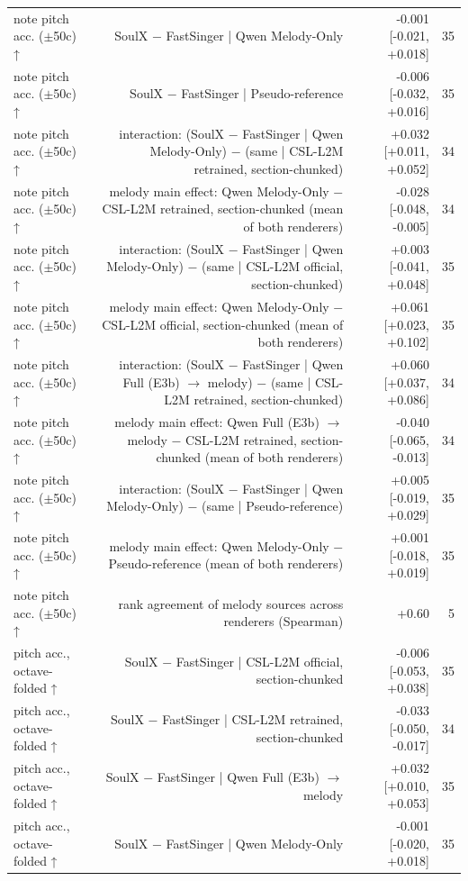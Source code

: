 \begin{table}[t]
\begin{tabular}{lrrr}
note pitch acc. ($\pm$50c) ↑ & SoulX $-$ FastSinger | Qwen Melody-Only & -0.001 [-0.021, +0.018] & 35 \\
note pitch acc. ($\pm$50c) ↑ & SoulX $-$ FastSinger | Pseudo-reference & -0.006 [-0.032, +0.016] & 35 \\
note pitch acc. ($\pm$50c) ↑ & interaction: (SoulX $-$ FastSinger | Qwen Melody-Only) $-$ (same | CSL-L2M retrained, section-chunked) & +0.032 [+0.011, +0.052] & 34 \\
note pitch acc. ($\pm$50c) ↑ & melody main effect: Qwen Melody-Only $-$ CSL-L2M retrained, section-chunked (mean of both renderers) & -0.028 [-0.048, -0.005] & 34 \\
note pitch acc. ($\pm$50c) ↑ & interaction: (SoulX $-$ FastSinger | Qwen Melody-Only) $-$ (same | CSL-L2M official, section-chunked) & +0.003 [-0.041, +0.048] & 35 \\
note pitch acc. ($\pm$50c) ↑ & melody main effect: Qwen Melody-Only $-$ CSL-L2M official, section-chunked (mean of both renderers) & +0.061 [+0.023, +0.102] & 35 \\
note pitch acc. ($\pm$50c) ↑ & interaction: (SoulX $-$ FastSinger | Qwen Full (E3b) $\rightarrow$ melody) $-$ (same | CSL-L2M retrained, section-chunked) & +0.060 [+0.037, +0.086] & 34 \\
note pitch acc. ($\pm$50c) ↑ & melody main effect: Qwen Full (E3b) $\rightarrow$ melody $-$ CSL-L2M retrained, section-chunked (mean of both renderers) & -0.040 [-0.065, -0.013] & 34 \\
note pitch acc. ($\pm$50c) ↑ & interaction: (SoulX $-$ FastSinger | Qwen Melody-Only) $-$ (same | Pseudo-reference) & +0.005 [-0.019, +0.029] & 35 \\
note pitch acc. ($\pm$50c) ↑ & melody main effect: Qwen Melody-Only $-$ Pseudo-reference (mean of both renderers) & +0.001 [-0.018, +0.019] & 35 \\
note pitch acc. ($\pm$50c) ↑ & rank agreement of melody sources across renderers (Spearman) & +0.60 & 5 \\
pitch acc., octave-folded ↑ & SoulX $-$ FastSinger | CSL-L2M official, section-chunked & -0.006 [-0.053, +0.038] & 35 \\
pitch acc., octave-folded ↑ & SoulX $-$ FastSinger | CSL-L2M retrained, section-chunked & -0.033 [-0.050, -0.017] & 34 \\
pitch acc., octave-folded ↑ & SoulX $-$ FastSinger | Qwen Full (E3b) $\rightarrow$ melody & +0.032 [+0.010, +0.053] & 35 \\
pitch acc., octave-folded ↑ & SoulX $-$ FastSinger | Qwen Melody-Only & -0.001 [-0.020, +0.018] & 35 \\

\end{tabular}
\end{table}
